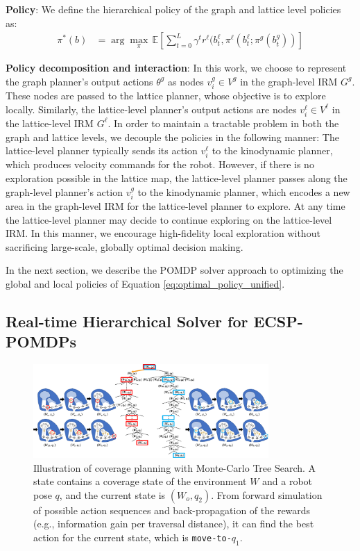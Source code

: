 \documentclass[letterpaper]{article} %
\newcommand{\ph}[1]{{\textbf{#1}:}} %
\begin{document}
\ph{Policy} We define the hierarchical policy of the graph and lattice level policies as:
\begin{align}
  \pi^{*}(b) &= \arg\max_\pi \, \mathbb{E} \left[ \sum_{t=0}^{L} \gamma^t r^\ell(b^\ell_t, \pi^\ell(b^\ell_t; \pi^g(b^g_t)) \right]
  \label{eq:optimal_policy_unified}
\end{align}

\ph{Policy decomposition and interaction} In this work, we choose to represent the graph planner's output actions $\theta^g$ as nodes $v^g_i \in V^g$ in the graph-level IRM $G^g$. These nodes are passed to the lattice planner, whose objective is to explore locally. Similarly, the lattice-level planner's output actions are nodes $v^\ell_i \in V^\ell$ in the lattice-level IRM $G^\ell$.  In order to maintain a tractable problem in both the graph and lattice levels, we decouple the policies in the following manner:  The lattice-level planner typically sends its action $v^\ell_i$ to the kinodynamic planner, which produces velocity commands for the robot.  However, if there is no exploration possible in the lattice map, the lattice-level planner passes along the graph-level planner's action $v^g_i$ to the kinodynamic planner, which encodes a new area in the graph-level IRM for the lattice-level planner to explore.  At any time the lattice-level planner may decide to continue exploring on the lattice-level IRM.  In this manner, we encourage high-fidelity local exploration without sacrificing large-scale, globally optimal decision making.

In the next section, we describe the POMDP solver approach to optimizing the global and local policies of Equation \ref{eq:optimal_policy_unified}.


\subsection{Real-time Hierarchical Solver for ECSP-POMDPs}



\begin{figure}[t!]
  \centering
  \includegraphics[width=0.8\textwidth]{figures/belief_tree_search_policy.pdf} %
  \caption{Illustration of coverage planning with Monte-Carlo Tree Search. A state contains a coverage state of the environment $W$ and a robot pose $q$, and the current state is $(W_o, q_2)$. From forward simulation of possible action sequences and back-propagation of the rewards (e.g., information gain per traversal distance), it can find the best action for the current state, which is \texttt{move-to-$q_1$}.}
  \label{fig:belief-tree-search}
\end{figure}
\end{document}
